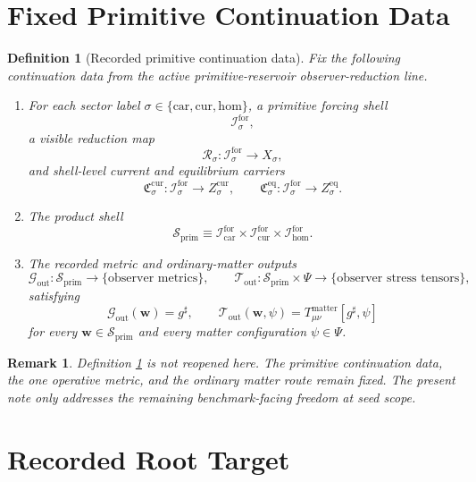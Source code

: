 \documentclass[11pt]{article}
\newcommand{\CompletedMetric}{g^{\sharp}}
\newcommand{\MatterSpace}{\Psi}
\newcommand{\Car}{\mathrm{car}}
\newcommand{\Cur}{\mathrm{cur}}
\newcommand{\Hom}{\mathrm{hom}}
\newcommand{\ForSpace}[1]{\mathcal I_{#1}^{\mathrm{for}}}
\newcommand{\PrimShell}{\mathcal S_{\mathrm{prim}}}
\newcommand{\Reduction}[1]{\mathcal R_{#1}}
\newcommand{\CurrentCarrier}[1]{\mathfrak C_{#1}^{\mathrm{cur}}}
\newcommand{\EqCarrier}[1]{\mathfrak C_{#1}^{\mathrm{eq}}}
\newcommand{\MetricOut}{\mathscr G_{\mathrm{out}}}
\newcommand{\MatterOut}{\mathscr T_{\mathrm{out}}}
\newtheorem{definition}{Definition}
\newtheorem{remark}{Remark}
\begin{document}
\section{Fixed Primitive Continuation Data}

\begin{definition}[Recorded primitive continuation data]
\label{def:fixed}
Fix the following continuation data from the active primitive-reservoir observer-reduction line.
\begin{enumerate}
    \item For each sector label \(\sigma\in\{\Car,\Cur,\Hom\}\), a primitive forcing shell
    \[
    \ForSpace{\sigma},
    \]
    a visible reduction map
    \[
    \Reduction{\sigma}:\ForSpace{\sigma}\to X_{\sigma},
    \]
    and shell-level current and equilibrium carriers
    \[
    \CurrentCarrier{\sigma}:\ForSpace{\sigma}\to Z_{\sigma}^{\mathrm{cur}},
    \qquad
    \EqCarrier{\sigma}:\ForSpace{\sigma}\to Z_{\sigma}^{\mathrm{eq}}.
    \]
    \item The product shell
    \[
    \PrimShell
    \equiv
    \ForSpace{\Car}\times \ForSpace{\Cur}\times \ForSpace{\Hom}.
    \]
    \item The recorded metric and ordinary-matter outputs
    \[
    \MetricOut:\PrimShell\to\{\text{observer metrics}\},
    \qquad
    \MatterOut:\PrimShell\times\MatterSpace\to\{\text{observer stress tensors}\},
    \]
    satisfying
    \begin{equation}
    \MetricOut(\mathbf w)=\CompletedMetric,
    \qquad
    \MatterOut(\mathbf w,\psi)
    =
    T_{\mu\nu}^{\mathrm{matter}}[\CompletedMetric,\psi]
    \label{eq:fixedoutputs}
    \end{equation}
    for every \(\mathbf w\in\PrimShell\) and every matter configuration \(\psi\in\MatterSpace\).
\end{enumerate}
\end{definition}

\begin{remark}
Definition \ref{def:fixed} is not reopened here. The primitive continuation data, the one operative metric, and the ordinary matter route remain fixed. The present note only addresses the remaining benchmark-facing freedom at seed scope.
\end{remark}

\section{Recorded Root Target}
\end{document}
